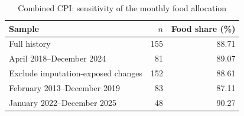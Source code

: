 \begin{table}[H]
\centering\small
\caption{Combined CPI: sensitivity of the monthly food allocation}
\label{tab:variancechecks}
\begin{tabularx}{\linewidth}{Xrr}
\toprule
Sample & $n$ & Food share (\%)\\
\midrule
Full history & 155 & 88.71\\
April 2018--December 2024 & 81 & 89.07\\
Exclude imputation-exposed changes & 152 & 88.61\\
February 2013--December 2019 & 83 & 87.11\\
January 2022--December 2025 & 48 & 90.27\\
\bottomrule
\end{tabularx}
\end{table}
